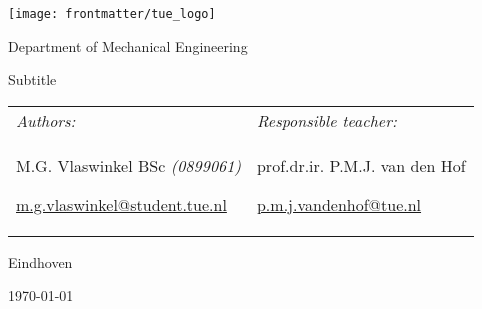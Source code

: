 \makeatletter
\begin{titlepage}
    \begin{center}
        \texttt{[image: frontmatter/tue\_logo]}\par
        \vspace{1.5em}
        {\sffamily \Large Department of Mechanical Engineering \par}
        \vspace{1.5em}
        { \par {\huge Subtitle}}
    \end{center}

    \vfill

    \begin{table}[H]
      \centering
        \begin{tabular}{>{\raggedright\arraybackslash}p{} >{\raggedleft\arraybackslash}p{}}
          \large\textit{Authors:}\vspace{.75em} &  \large\textit{Responsible teacher:}\vspace{.75em} \\

          M.G. Vlaswinkel BSc \emph{(0899061)}\par
          \href{mailto:m.g.vlaswinkel@student.tue.nl}{m.g.vlaswinkel@student.tue.nl}
          &

          prof.dr.ir. P.M.J. van den Hof \par
          \href{mailto:p.m.j.vandenhof@tue.nl}{p.m.j.vandenhof@tue.nl}
        \end{tabular}
     \end{table}

    \begin{center}
        {\large Eindhoven\par}\vspace{-\parskip}
        {\large \today\par}
    \end{center}
\end{titlepage}

 \pagestyle{frontmatter}
\tableofcontents
\thispagestyle{credits} \newpage

\printglossary[type=\acronymtype, title=List of abbreviations, style=abbreviations] \newpage
\printglossary[type=symbols, title=List of symbols, style=symbols] \newpage